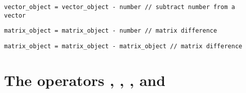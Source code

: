 \documentclass{admbmanual}
\begin{document}
\begin{lstlisting}
vector_object = vector_object - number // subtract number from a vector
\end{lstlisting}
\begin{lstlisting}
matrix_object = matrix_object - number // matrix difference
\end{lstlisting}
\begin{lstlisting}
matrix_object = matrix_object - matrix_object // matrix difference
\end{lstlisting}

\section{The operators \ttpluseq,  \ttminuseq, \ttmultiplyeq, and \ttdivideeq}
\end{document}
